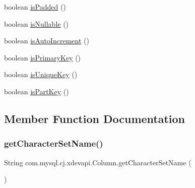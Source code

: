 \begin{DoxyCompactItemize}
\item 
boolean \mbox{\hyperlink{interfacecom_1_1mysql_1_1cj_1_1xdevapi_1_1_column_a8321f346d06a83d45e78d10b44bb2359}{is\+Padded}} ()
\item 
boolean \mbox{\hyperlink{interfacecom_1_1mysql_1_1cj_1_1xdevapi_1_1_column_aca125bcbe7d9b423502b2dbe864b85f9}{is\+Nullable}} ()
\item 
boolean \mbox{\hyperlink{interfacecom_1_1mysql_1_1cj_1_1xdevapi_1_1_column_a497ba06454ec1c5f48f23f890ccc241f}{is\+Auto\+Increment}} ()
\item 
boolean \mbox{\hyperlink{interfacecom_1_1mysql_1_1cj_1_1xdevapi_1_1_column_a4c736251ff3d1d2d5e7442458f0c03e4}{is\+Primary\+Key}} ()
\item 
boolean \mbox{\hyperlink{interfacecom_1_1mysql_1_1cj_1_1xdevapi_1_1_column_a6ce1520bc455622d374b2ad758b683e2}{is\+Unique\+Key}} ()
\item 
boolean \mbox{\hyperlink{interfacecom_1_1mysql_1_1cj_1_1xdevapi_1_1_column_aea6f831cb621dfac512d6d2d95fbeb87}{is\+Part\+Key}} ()
\end{DoxyCompactItemize}


\subsection{Member Function Documentation}
\mbox{\label{interfacecom_1_1mysql_1_1cj_1_1xdevapi_1_1_column_acbe28bced9088c55b3d24bc62341a8b5}} 
\subsubsection{\texorpdfstring{get\+Character\+Set\+Name()}{getCharacterSetName()}}
{\footnotesize\ttfamily String com.\+mysql.\+cj.\+xdevapi.\+Column.\+get\+Character\+Set\+Name (\begin{DoxyParamCaption}{ }\end{DoxyParamCaption})}

\mbox{\label{interfacecom_1_1mysql_1_1cj_1_1xdevapi_1_1_column_af3f5205b507019a4372c02452d3650b1}} 
